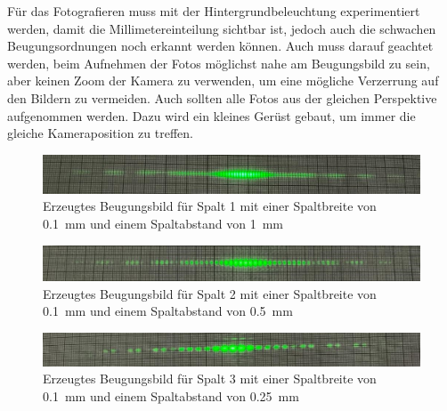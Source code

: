 \documentclass[12pt,english,ngerman]{scrartcl}
\begin{document}
Für das Fotografieren muss mit der Hintergrundbeleuchtung experimentiert werden, damit die Millimetereinteilung sichtbar ist,
jedoch auch die schwachen Beugungsordnungen noch erkannt werden können. Auch muss darauf geachtet werden, beim Aufnehmen der
Fotos möglichst nahe am Beugungsbild zu sein, aber keinen Zoom der Kamera zu verwenden, um eine mögliche Verzerrung auf den 
Bildern zu vermeiden. Auch sollten alle Fotos aus der gleichen Perspektive aufgenommen werden. Dazu wird ein kleines Gerüst
gebaut, um immer die gleiche Kameraposition zu treffen.


\begin{figure}[H]
	\begin{center}
		\includegraphics[width =\textwidth]{./figures/beugungsbild_spalt1_neu.jpg}
	\end{center}
	\caption{Erzeugtes Beugungsbild für Spalt 1 mit einer Spaltbreite von \SI{0.1}{\milli\meter} und einem Spaltabstand 
    von \SI{1}{\milli\meter}}
	\label{fig:beugungsbild_spalt1}
\end{figure}

\begin{figure}[H]
	\begin{center}
		\includegraphics[width =\textwidth]{./figures/beugungsbild_spalt2_neu.jpg}
	\end{center}
	\caption{Erzeugtes Beugungsbild für Spalt 2 mit einer Spaltbreite von \SI{0.1}{\milli\meter} und einem Spaltabstand 
    von \SI{0.5}{\milli\meter}}
	\label{fig:beugungsbild_spalt2}
\end{figure}

\begin{figure}[H]
	\begin{center}
		\includegraphics[width =\textwidth]{./figures/beugungsbild_spalt3_neu.jpg}
	\end{center}
	\caption{Erzeugtes Beugungsbild für Spalt 3 mit einer Spaltbreite von \SI{0.1}{\milli\meter} und einem Spaltabstand 
    von \SI{0.25}{\milli\meter}}
	\label{fig:beugungsbild_spalt3}
\end{figure}
\end{document}
